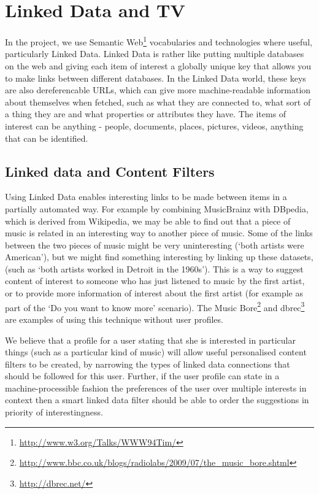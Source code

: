 \documentclass[]{article}%
\begin{document}
\section{Linked Data and TV}

In the project, we use Semantic Web\footnote{\url{http://www.w3.org/Talks/WWW94Tim/}} vocabularies and technologies where useful, particularly Linked Data. Linked Data is rather like putting multiple databases on the web and giving each item of interest a globally unique key that allows you to make links between different databases. In the Linked Data world, these keys are also dereferencable URLs, which can give more machine-readable information about themselves when fetched, such as what they are connected to, what sort of a thing they are and what properties or attributes they have. The items of interest can be anything - people, documents, places, pictures, videos, anything that can be identified. 

\subsection{Linked data and Content Filters}

Using Linked Data enables interesting links to be made between items in a partially automated way. For example by combining MusicBrainz with DBpedia, which is derived from Wikipedia, we may be able to find out that a piece of music is related in an interesting way to another piece of music. Some of the links between the two pieces of music might be very uninteresting (`both artists were American'), but we might find something interesting by linking up these datasets, (such as `both artists worked in Detroit in the 1960s'). This is a way to suggest content of interest to someone who has just listened to music by the first artist, or to provide more information of interest about the first artist (for example as part of the `Do you want to know more' scenario). The Music Bore\footnote{\url{http://www.bbc.co.uk/blogs/radiolabs/2009/07/the_music_bore.shtml}} and dbrec\footnote{\url{http://dbrec.net/}} are examples of using this technique without user profiles. 

We believe that a profile for a user stating that she is interested in particular things (such as a particular kind of music) will allow useful personalised content filters to be created, by narrowing the types of linked data connections that should be followed for this user. Further, if the user profile can state in a machine-processible fashion the preferences of the user over multiple interests in context then a smart linked data filter should be able to order the suggestions in priority of interestingness. 
\end{document}
